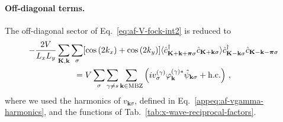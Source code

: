 \paragraph{Off-diagonal terms.}

The off-diagonal sector of Eq.~\eqref{eq:af-V-fock-int2} is reduced to
\begin{multline}
	-\frac{2V}{L_x L_y} \sum_{\mathbf{K}, \mathbf{k}} \sum_\sigma [
	\cos \left(
	2k_x
	\right)	+ \cos \left(
	2k_y
	\right)	
	] \langle
	\hat c_{\mathbf{K}+\mathbf{k}+\bm{\pi} \sigma}^\dagger 
	\hat c_{\mathbf{K}+\mathbf{k} \sigma}
	\rangle
	\hat c_{\mathbf{K}-\mathbf{k} \sigma}^\dagger \hat c_{\mathbf{K}-\mathbf{k}-\bm{\pi} \sigma} \\
	= V\sum_\sigma \sum_{\gamma \neq s}
	\sum_{\mathbf{k}\in\mathrm{MBZ}}
	\left(
	iv^{(\gamma)}_\sigma \varphi_\mathbf{k}^{(\gamma)*}
	\hat \psi_{\mathbf{k}\sigma} + \mathrm{h.c.}
	\right) \, ,
	\label{eq:af-V-fock-int4-offdiag}
\end{multline}
where we used the harmonics of $v_{\mathbf{k}\sigma}$, defined in Eq.~\eqref{appeq:af-vgamma-harmonics}, and the functions of Tab.~\ref{tab:x-wave-reciprocal-factors}.

